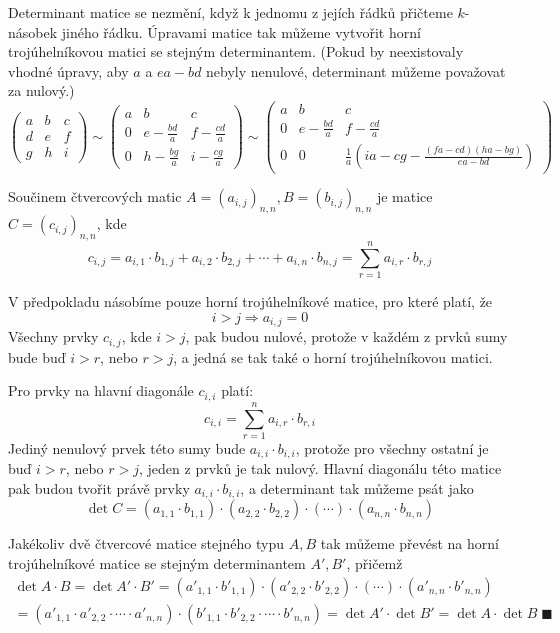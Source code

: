 \documentclass[12pt,a4paper]{article}
\begin{document}
Determinant matice se nezmění, když k jednomu z jejích řádků přičteme $k$-násobek jiného řádku. Úpravami matice tak můžeme vytvořit horní trojúhelníkovou matici se stejným determinantem. (Pokud by neexistovaly vhodné úpravy, aby $a$ a $ea-bd$ nebyly nenulové, determinant můžeme považovat za nulový.)
\renewcommand{\arraystretch}{1.25}
\[
 \begin{pmatrix}
  a & b & c \\
  d & e & f \\
  g & h & i
 \end{pmatrix} \sim
 \begin{pmatrix}
  a & b & c \\
  0 & e - \frac{bd}{a} & f - \frac{cd}{a} \\
  0 & h - \frac{bg}{a} & i - \frac{cg}{a}
 \end{pmatrix} \sim
 \begin{pmatrix}
  a & b & c \\
  0 & e - \frac{bd}{a} & f - \frac{cd}{a} \\
  0 & 0 & \frac{1}{a}(ia-cg-\frac{(fa-cd)(ha-bg)}{ea-bd})
 \end{pmatrix}
\]
\renewcommand{\arraystretch}{1}

Součinem čtvercových matic \(A = (a_{i,j})_{n,n}, B = (b_{i,j})_{n,n}\) je matice \(C = (c_{i,j})_{n,n}\), kde
\[
 c_{i,j} = a_{i,1}\cdot b_{1,j} + a_{i,2}\cdot b_{2,j} + \cdots + a_{i,n}\cdot b_{n,j} = \sum_{r=1}^n a_{i,r}\cdot b_{r,j}
\]

V předpokladu násobíme pouze horní trojúhelníkové matice, pro které platí, že
\[
 i > j \Rightarrow a_{i,j} = 0
\]
Všechny prvky $c_{i,j}$, kde $i > j$, pak budou nulové, protože v každém z prvků sumy bude buď $i > r$, nebo $r > j$, a jedná se tak také o horní trojúhelníkovou matici.

Pro prvky na hlavní diagonále $c_{i,i}$ platí:
\[
 c_{i,i} = \sum_{r=1}^n a_{i,r}\cdot b_{r,i}
\]
Jediný nenulový prvek této sumy bude $a_{i,i}\cdot b_{i,i}$, protože pro všechny ostatní je buď $i > r$, nebo $r > j$, jeden z prvků je tak nulový. Hlavní diagonálu této matice pak budou tvořit právě prvky $a_{i,i}\cdot b_{i,i}$, a determinant tak můžeme psát jako
\[
 \det{C} = (a_{1,1}\cdot b_{1,1})\cdot (a_{2,2}\cdot b_{2,2})\cdot (\cdots) \cdot (a_{n,n}\cdot b_{n,n})
\]

Jakékoliv dvě čtvercové matice stejného typu $A, B$ tak můžeme převést na horní trojúhelníkové matice se stejným determinantem $A', B'$, přičemž
\begin{multline*}
 \det{A\cdot B} = \det{A' \cdot B'} = (a'_{1,1}\cdot b'_{1,1})\cdot (a'_{2,2}\cdot b'_{2,2})\cdot (\cdots) \cdot (a'_{n,n}\cdot b'_{n,n}) \\= (a'_{1,1}\cdot a'_{2,2}\cdot \cdots \cdot a'_{n,n})\cdot (b'_{1,1}\cdot b'_{2,2}\cdot \cdots \cdot b'_{n,n}) = \det{A'}\cdot \det{B'} = \det{A}\cdot \det{B}\;\blacksquare
\end{multline*}
\end{document}
